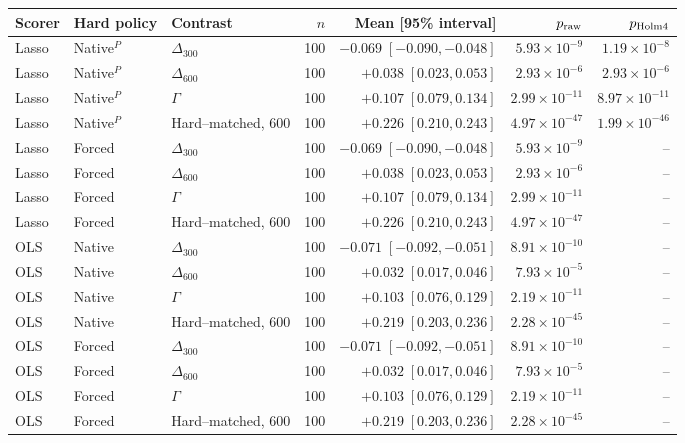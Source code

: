 \begin{tabular}{lllrrrr}
\toprule
Scorer & Hard policy & Contrast & $n$ & Mean [95\% interval] & $p_{\rm raw}$ & $p_{\rm Holm4}$ \\
\midrule
Lasso & Native$^{P}$ & $\Delta_{300}$ & 100 & $-0.069\;[-0.090,-0.048]$ & $5.93\times10^{-9}$ & $1.19\times10^{-8}$ \\
Lasso & Native$^{P}$ & $\Delta_{600}$ & 100 & $+0.038\;[0.023,0.053]$ & $2.93\times10^{-6}$ & $2.93\times10^{-6}$ \\
Lasso & Native$^{P}$ & $\Gamma$ & 100 & $+0.107\;[0.079,0.134]$ & $2.99\times10^{-11}$ & $8.97\times10^{-11}$ \\
Lasso & Native$^{P}$ & Hard--matched, $600$ & 100 & $+0.226\;[0.210,0.243]$ & $4.97\times10^{-47}$ & $1.99\times10^{-46}$ \\
\midrule
Lasso & Forced & $\Delta_{300}$ & 100 & $-0.069\;[-0.090,-0.048]$ & $5.93\times10^{-9}$ & -- \\
Lasso & Forced & $\Delta_{600}$ & 100 & $+0.038\;[0.023,0.053]$ & $2.93\times10^{-6}$ & -- \\
Lasso & Forced & $\Gamma$ & 100 & $+0.107\;[0.079,0.134]$ & $2.99\times10^{-11}$ & -- \\
Lasso & Forced & Hard--matched, $600$ & 100 & $+0.226\;[0.210,0.243]$ & $4.97\times10^{-47}$ & -- \\
\midrule
OLS & Native & $\Delta_{300}$ & 100 & $-0.071\;[-0.092,-0.051]$ & $8.91\times10^{-10}$ & -- \\
OLS & Native & $\Delta_{600}$ & 100 & $+0.032\;[0.017,0.046]$ & $7.93\times10^{-5}$ & -- \\
OLS & Native & $\Gamma$ & 100 & $+0.103\;[0.076,0.129]$ & $2.19\times10^{-11}$ & -- \\
OLS & Native & Hard--matched, $600$ & 100 & $+0.219\;[0.203,0.236]$ & $2.28\times10^{-45}$ & -- \\
\midrule
OLS & Forced & $\Delta_{300}$ & 100 & $-0.071\;[-0.092,-0.051]$ & $8.91\times10^{-10}$ & -- \\
OLS & Forced & $\Delta_{600}$ & 100 & $+0.032\;[0.017,0.046]$ & $7.93\times10^{-5}$ & -- \\
OLS & Forced & $\Gamma$ & 100 & $+0.103\;[0.076,0.129]$ & $2.19\times10^{-11}$ & -- \\
OLS & Forced & Hard--matched, $600$ & 100 & $+0.219\;[0.203,0.236]$ & $2.28\times10^{-45}$ & -- \\
\bottomrule
\end{tabular}
